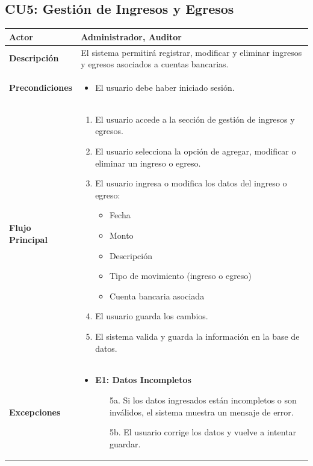 \documentclass{article}
\begin{document}
\subsection{CU5: Gestión de Ingresos y Egresos}
\begin{longtable}{|l|p{10cm}|}
\hline
\textbf{Actor} & Administrador, Auditor \\ \hline
\textbf{Descripción} & El sistema permitirá registrar, modificar y eliminar ingresos y egresos asociados a cuentas bancarias. \\ \hline
\textbf{Precondiciones} & 
\begin{itemize}
    \item El usuario debe haber iniciado sesión.
\end{itemize} \\ \hline
\textbf{Flujo Principal} & 
\begin{enumerate}
    \item El usuario accede a la sección de gestión de ingresos y egresos.
    \item El usuario selecciona la opción de agregar, modificar o eliminar un ingreso o egreso.
    \item El usuario ingresa o modifica los datos del ingreso o egreso:
    \begin{itemize}
        \item Fecha
        \item Monto
        \item Descripción
        \item Tipo de movimiento (ingreso o egreso)
        \item Cuenta bancaria asociada
    \end{itemize}
    \item El usuario guarda los cambios.
    \item El sistema valida y guarda la información en la base de datos.
\end{enumerate} \\ \hline
\textbf{Excepciones} & 
\begin{itemize}
    \item \textbf{E1: Datos Incompletos}
    \begin{enumerate}
        \item[5a.] Si los datos ingresados están incompletos o son inválidos, el sistema muestra un mensaje de error.
        \item[5b.] El usuario corrige los datos y vuelve a intentar guardar.
    \end{enumerate}

\end{itemize}
\end{longtable}
\end{document}
